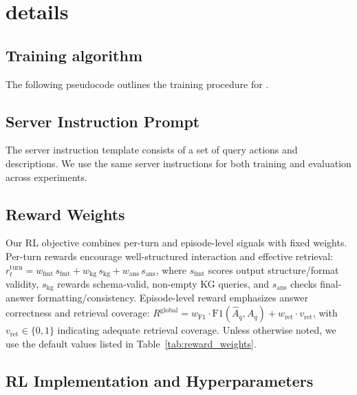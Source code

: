 \section{\framework{} details}
\label{sec:kgr1_details}

\subsection{Training algorithm}

The following pseudocode outlines the training procedure for \texttt{\framework{}}. 



\subsection{Server Instruction Prompt}
The server instruction template consists of a set of query actions and descriptions. We use the same server instructions for both training and evaluation across experiments. 


\subsection{Reward Weights}
Our RL objective combines per-turn and episode-level signals with fixed weights. 
Per-turn rewards encourage well-structured interaction and effective retrieval:
$r_t^{\mathrm{turn}}=w_{\mathrm{fmt}}\,s_{\mathrm{fmt}}+
w_{\mathrm{kg}}\,s_{\mathrm{kg}}+
w_{\mathrm{ans}}\,s_{\mathrm{ans}}$,
where $s_{\mathrm{fmt}}$ scores output structure/format validity, 
$s_{\mathrm{kg}}$ rewards schema-valid, non-empty KG queries, 
and $s_{\mathrm{ans}}$ checks final-answer formatting/consistency. 
Episode-level reward emphasizes answer correctness and retrieval coverage:
$R^{\mathrm{global}}=w_{\mathrm{F1}}\cdot \mathrm{F1}(\hat A_q,A_q)+
w_{\mathrm{ret}}\cdot v_{\mathrm{ret}}$, 
with $v_{\mathrm{ret}}\in\{0,1\}$ indicating adequate retrieval coverage. 
Unless otherwise noted, we use the default values listed in Table~\ref{tab:reward_weights}.


\subsection{RL Implementation and Hyperparameters}
\label{appendix:implementation_details}




